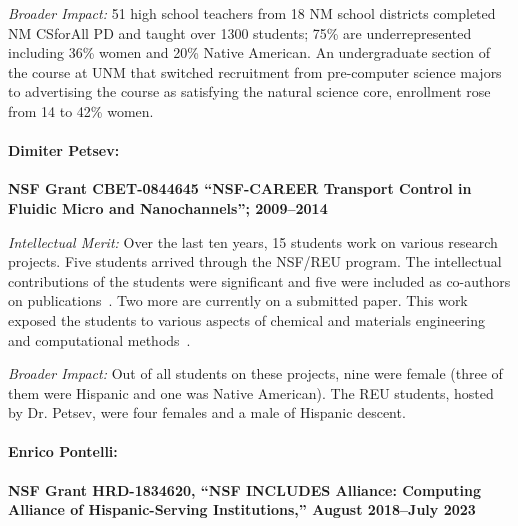 \noindent \textit{Broader Impact:}
51 high school teachers from 18 NM school districts completed NM CSforAll PD and taught over 1300 students; 75\% are underrepresented including 36\% women and 20\% Native American. An undergraduate section of the course at UNM that switched recruitment from pre-computer science majors to advertising the course as satisfying the natural science core, enrollment rose from 14 to 42\% women. 

\paragraph{Dimiter Petsev:}
\textbf{NSF Grant CBET-0844645 ``NSF-CAREER Transport Control in Fluidic Micro and Nanochannels''; 2009--2014}

\noindent\textit{Intellectual Merit:}  Over the last ten years, 15 students work on various research projects. Five students arrived through the NSF/REU program. The intellectual contributions of the students were significant and five were included as co-authors on publications~\cite{petsev1,petsev2,petsev3,petsev4,petsev5,petsev5}. Two more are currently on a submitted paper. This work exposed the students to various aspects of chemical and materials engineering and computational methods~\cite{petsev7}.

\noindent\textit{Broader Impact:} Out of all students on these projects, nine were female (three of them were Hispanic and one was Native American). The REU students, hosted by Dr. Petsev, were four females and a male of Hispanic descent.    

\paragraph{Enrico Pontelli:}
\textbf{NSF Grant HRD-1834620, ``NSF INCLUDES Alliance: Computing Alliance of Hispanic-Serving Institutions,'' August 2018--July 2023}

